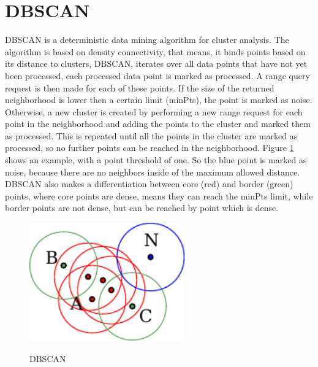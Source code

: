 \section{\acl{DBSCAN}}

\ac{DBSCAN} \cite{DBSCAN} is a deterministic data mining algorithm for cluster analysis. The algorithm is based on density connectivity,
that means, it binds points based on its distance to clusters, \ac {DBSCAN}, iterates over all data points that have not yet been processed, 
each processed data point is marked as processed. A range query request is then made for each of these points. If the size of the returned neighborhood is lower then a certain limit (minPts),
the point is marked as noise. Otherwise, a new cluster is created by performing a new range request for each point in the neighborhood 
and adding the points to the cluster and marked them as processed. This is repeated until all the points in the cluster are marked as processed, so no further points can be reached in the neighborhood.
Figure \ref{dbscan} shows an example, with a point threshold of one. So the blue point is marked as noise, because there are no neighbors inside of the maximum allowed distance.
\ac{DBSCAN} also makes a differentiation between core (red) and border (green) points, where core points are dense, means they can reach the minPts limit, while border points are not dense, but can be reached by
point which is dense.

\begin{figure}[!ht]
\begin{center}
\caption{\acs{DBSCAN}}
\includegraphics[width=0.6\textwidth]{bilder/dbscan.pdf}
\label{dbscan}
\end{center}
\end{figure}

